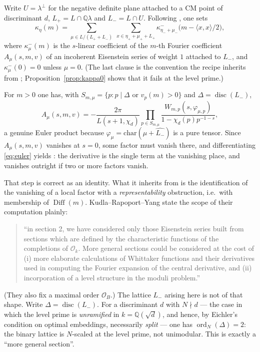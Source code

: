\documentclass[11pt,reqno]{amsart}
\theoremstyle{plain}
\theoremstyle{definition}
\DeclareMathOperator{\Diff}{Diff}
\DeclareMathOperator{\ord}{ord}
\DeclareMathOperator{\disc}{disc}
\newcommand{\Q}{\mathbb{Q}}
\newcommand{\Lm}{L_{-}}
\newcommand{\Lp}{L_{+}}
\begin{document}
Write $U=\lambda^\perp$ for the negative definite plane attached to a CM point of discriminant $d$,
$\Lp=L\cap\Q\lambda$ and $\Lm=L\cap U$. Following \cite[(11),(12)]{Yang}, one sets
\[
  \kappa_\eta(m)=\sum_{\mu\in L/(\Lp+\Lm)}\ \sum_{x\in \eta_++\mu_++\Lp}
     \kappa^-_{\eta_-+\mu_-}\!\bigl(m-\langle x,x\rangle/2\bigr),
\]
where $\kappa^-_\mu(m)$ is the $s$-linear coefficient of the $m$-th Fourier coefficient
$A_\mu(s,m,v)$ of an incoherent Eisenstein series of weight $1$ attached to $\Lm$, and
$\kappa^-_\mu(0)=0$ unless $\mu=0$. (The last clause is the convention the recipe inherits from
\cite[Lemma~2.21]{Schofer}; Proposition~\ref{prop:kappa0} shows that it fails at the level
prime.)

For $m>0$ one has, with $S_{m,\mu}=\{p: p\mid \Delta \text{ or } v_p(m)>0\}$ and
$\Delta=\disc(\Lm)$,
\begin{equation}\label{eq:euler}
  A_\mu(s,m,v)=-\frac{2\pi}{L(s+1,\chi_d)}\prod_{p\in S_{m,\mu}}
    \frac{W_{m,p}(s,\varphi_{\mu,p})}{1-\chi_d(p)p^{-1-s}},
\end{equation}
a genuine Euler product because $\varphi_\mu=\mathrm{char}(\mu+\widehat{\Lm})$ is a pure tensor.
Since $A_\mu(s,m,v)$ vanishes at $s=0$, some factor must vanish there, and differentiating
\eqref{eq:euler} yields \cite[Lemma 16]{Yang}: the derivative is the single term at the vanishing
place, and vanishes outright if two or more factors vanish.

That step is correct as an identity. What it inherits from \cite{KRY} is the identification of the
vanishing of a local factor with a \emph{representability} obstruction, i.e.\ with membership of
$\Diff(m)$. Kudla--Rapoport--Yang state the scope of their computation plainly:

\begin{quote}
``in section 2, we have considered only those Eisenstein series built from sections which are
defined by the characteristic functions of the completions of $\mathcal{O}_k$. More general sections
could be considered at the cost of (i) more elaborate calculations of Whittaker functions and their
derivatives used in computing the Fourier expansion of the central derivative, and (ii)
incorporation of a level structure in the moduli problem.'' \cite[\S6]{KRY}
\end{quote}

\noindent
(They also fix a maximal order $\mathcal{O}_B$.) The lattice $\Lm$ arising here is not of that
shape. Write $\Delta=\disc(\Lm)$. For a discriminant $d$ with $N\nmid d$ --- the case in which the
level prime is \emph{unramified} in $k=\Q(\sqrt d)$, and hence, by Eichler's condition on optimal
embeddings, necessarily \emph{split} --- one has $\ord_N(\Delta)=2$: the binary lattice is
$N$-scaled at the level prime, not unimodular. This is exactly a ``more general section''.
\end{document}

